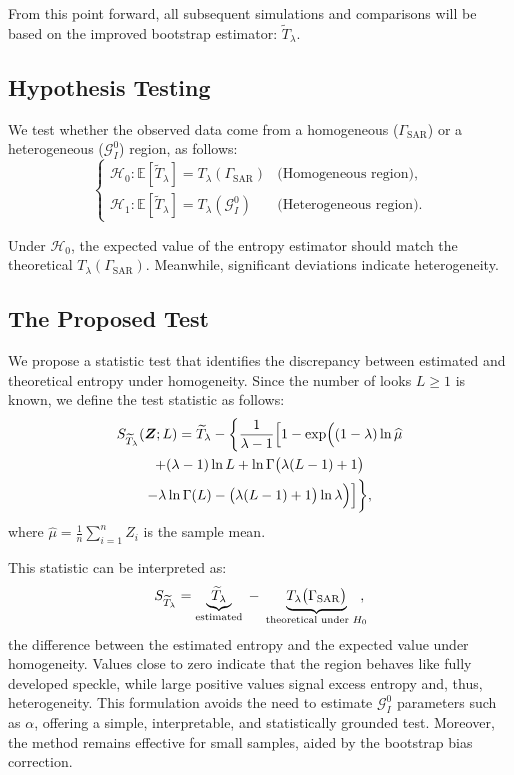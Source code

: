 \documentclass[
  lettersize  journal,
]{IEEEtran}%
\begin{document}
From this point forward, all subsequent simulations and comparisons will
be based on the improved bootstrap estimator:
\(\widetilde{T}_{\lambda}\).

\subsection{Hypothesis Testing}\label{hypothesis-testing}

We test whether the observed data come from a homogeneous
(\(\Gamma_{\text{SAR}}\)) or a heterogeneous (\(\mathcal{G}^0_I\))
region, as follows: \begin{equation}\label{eq:hypothesis_test}
\begin{cases}
\mathcal{H}_0: \mathbb{E}[\widetilde{T}_{\lambda}] = T_{\lambda}(\Gamma_{\text{SAR}}) & \text{(Homogeneous region)}, \\[6pt]
\mathcal{H}_1: \mathbb{E}[\widetilde{T}_{\lambda}] = T_{\lambda}(\mathcal{G}^0_I) & \text{(Heterogeneous region)}.
\end{cases}
\end{equation}

Under \(\mathcal{H}_0\), the expected value of the entropy estimator
should match the theoretical \(T_{\lambda}(\Gamma_{\text{SAR}})\).
Meanwhile, significant deviations indicate heterogeneity.

\subsection{The Proposed Test}\label{the-proposed-test}

We propose a statistic test that identifies the discrepancy between
estimated and theoretical entropy under homogeneity. Since the number of
looks \(L\geq1\) is known, we define the test statistic as follows:
\begin{multline}
\label{eq-test-tsallis}
S_{\widetilde{T}_{\lambda}}(\bm{Z}; L) = \widetilde{T}_{\lambda} - \biggl\{ \frac{1}{\lambda - 1} \Bigl[ 1 -
\exp\Bigl(
(1 - \lambda)\ln \widehat{\mu}\\
+ (\lambda - 1)\ln L
+ \ln\Gamma\bigl(\lambda(L - 1) + 1\bigr) \\
- \lambda\ln\Gamma(L)
- \bigl(\lambda(L - 1) + 1\bigr)\ln \lambda
\Bigr) \Bigr] \biggr\},
\end{multline} where \(\widehat{\mu} = \frac{1}{n} \sum_{i=1}^n Z_i\) is
the sample mean.

This statistic can be interpreted as: \[
S_{\widetilde T_\lambda} 
= 
\underbrace{\widetilde T_\lambda}_{\text{estimated}} 
\;-\;
\underbrace{T_\lambda\bigl(\Gamma_{\mathrm{SAR}}\bigr)}_{\text{theoretical under } H_0}\hspace{-0.5em},
\] the difference between the estimated entropy and the expected value
under homogeneity. Values close to zero indicate that the region behaves
like fully developed speckle, while large positive values signal excess
entropy and, thus, heterogeneity. This formulation avoids the need to
estimate \(\mathcal{G}^0_I\) parameters such as \(\alpha\), offering a
simple, interpretable, and statistically grounded test. Moreover, the
method remains effective for small samples, aided by the bootstrap bias
correction.
\end{document}

